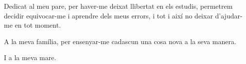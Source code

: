 
\begin{dedication} %

Dedicat al meu pare, per haver-me deixat llibertat en els estudis, permetrem decidir equivocar-me i aprendre dels meus errors, i tot i així no deixar d'ajudar-me en tot moment.

A la meva família, per ensenyar-me cadascun una cosa nova a la seva manera.

I a la meva mare.

\end{dedication}

